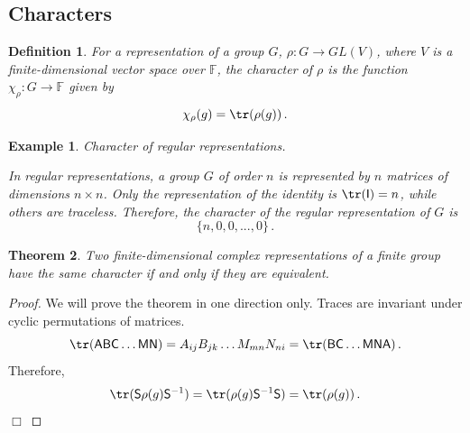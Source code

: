 \documentclass{article}
\theoremstyle{plain}\theoremheaderfont{\normalfont\itshape}\theorembodyfont{\rmfamily}\theoremseparator{.}\newtheorem*{rem}{Remark}\newtheorem*{ex}{Example}\newtheorem*{proof}{Proof}\newtheorem*{altp}{Alternative proof}
\theoremstyle{plain}\theoremheaderfont{\normalfont\bfseries}\theorembodyfont{\rmfamily}\theoremseparator{.}\newtheorem{thm}{Theorem}[section]\newtheorem{lem}[thm]{Lemma}\newtheorem{prop}[thm]{Proposition}\newtheorem*{cor}{Corollary}\newtheorem{defn}[thm]{Definition}\newtheorem{clm}[thm]{Claim}\newtheorem{clminproof}{Claim}
\theoremstyle{break}\theoremheaderfont{\normalfont\itshape}\theorembodyfont{\rmfamily}\theoremseparator{.\medskip}\newtheorem*{proofskip}{Proof}\newtheorem*{exs}{Examples}\newtheorem*{rems}{Remarks}
\theoremstyle{break}\theoremheaderfont{\normalfont\bfseries}\theorembodyfont{\rmfamily}\theoremseparator{.\medskip}\newtheorem{lemskip}[thm]{Lemma}\newtheorem{defnskip}[thm]{Definition}\newtheorem{propskip}[thm]{Proposition}\newtheorem{thmskip}[thm]{Theorem}
\numberwithin{equation}{section}
\newcommand{\qed}{\hfill\ensuremath{\Box}}
\begin{document}
	\subsection{Characters}
	\begin{defn}
		For a representation of a group \(G\), \(\rho:G\to GL(V)\), where \(V\) is a finite-dimensional vector space over \(\mathbb{F}\), the \textit{character} of \(\rho\) is the function \(\chi_\rho: G\to \mathbb{F}\) given by
		\[\chi_\rho(g)=\tr(\rho(g))\,.\]
	\end{defn}
	\begin{ex}
		\textit{Character of regular representations.}

		In regular representations, a group \(G\) of order \(n\) is represented by \(n\) matrices of dimensions \(n\times n\). Only the representation of the identity is \(\tr(\mathsf{I})=n\), while others are traceless. Therefore, the character of the regular representation of \(G\) is
		\[\{n,0,0,...,0\}\,.\]
	\end{ex}
	\begin{thm}\label{equivcha}
		Two finite-dimensional complex representations of a finite group have the same character if and only if they are equivalent.
	\end{thm}
	\begin{proof}
		We will prove the theorem in one direction only. Traces are invariant under cyclic permutations of matrices.
		\[\tr(\mathsf{ABC\dots MN})=A_{ij}B_{jk}\dots M_{mn}N_{ni}=\tr(\mathsf{BC\dots MNA})\,.\]
		Therefore,
		\[\tr(\mathsf{S}\rho(g)\mathsf{S}^{-1})=\tr(\rho(g)\mathsf{S}^{-1}\mathsf{S})=\tr(\rho(g))\,.\]\qed
	\end{proof}
\end{document}
